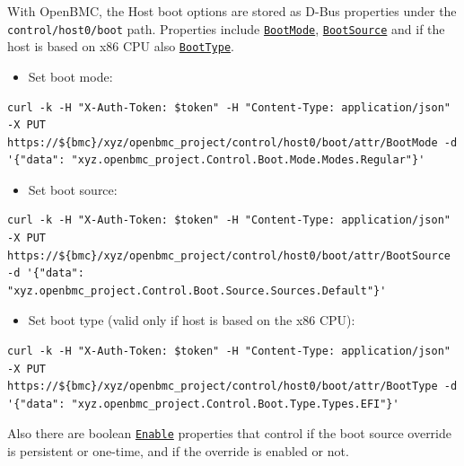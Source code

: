 With OpenBMC, the Host boot options are stored as D-Bus properties under
the \texttt{control/host0/boot} path. Properties include
\href{https://github.com/openbmc/phosphor-dbus-interfaces/blob/master/yaml/xyz/openbmc_project/Control/Boot/Mode.interface.yaml}{\texttt{BootMode}},
\href{https://github.com/openbmc/phosphor-dbus-interfaces/blob/master/yaml/xyz/openbmc_project/Control/Boot/Source.interface.yaml}{\texttt{BootSource}}
and if the host is based on x86 CPU also
\href{https://github.com/openbmc/phosphor-dbus-interfaces/blob/master/yaml/xyz/openbmc_project/Control/Boot/Type.interface.yaml}{\texttt{BootType}}.

\begin{itemize}
\tightlist
\item
  Set boot mode:
\end{itemize}

\begin{verbatim}
curl -k -H "X-Auth-Token: $token" -H "Content-Type: application/json" -X PUT https://${bmc}/xyz/openbmc_project/control/host0/boot/attr/BootMode -d '{"data": "xyz.openbmc_project.Control.Boot.Mode.Modes.Regular"}'
\end{verbatim}

\begin{itemize}
\tightlist
\item
  Set boot source:
\end{itemize}

\begin{verbatim}
curl -k -H "X-Auth-Token: $token" -H "Content-Type: application/json" -X PUT https://${bmc}/xyz/openbmc_project/control/host0/boot/attr/BootSource -d '{"data": "xyz.openbmc_project.Control.Boot.Source.Sources.Default"}'
\end{verbatim}

\begin{itemize}
\tightlist
\item
  Set boot type (valid only if host is based on the x86 CPU):
\end{itemize}

\begin{verbatim}
curl -k -H "X-Auth-Token: $token" -H "Content-Type: application/json" -X PUT https://${bmc}/xyz/openbmc_project/control/host0/boot/attr/BootType -d '{"data": "xyz.openbmc_project.Control.Boot.Type.Types.EFI"}'
\end{verbatim}

Also there are boolean
\href{https://github.com/openbmc/phosphor-dbus-interfaces/blob/master/yaml/xyz/openbmc_project/Object/Enable.interface.yaml}{\texttt{Enable}}
properties that control if the boot source override is persistent or
one-time, and if the override is enabled or not.

